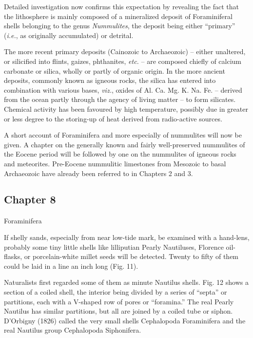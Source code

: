 \documentclass[a4paper, 12pt, oneside]{article}
\begin{document}
Detailed investigation now confirms this expectation by revealing the fact that the lithosphere is mainly composed of a mineralized deposit of Foraminiferal shells belonging to the genus \emph{Nummulites}, the deposit being either ``primary'' (\emph{i.e.}, as originally accumulated) or detrital.

The more recent primary deposits (Cainozoic to Archaeozoic) -- either unaltered, or silicified into flints, gaizes, phthanites, \emph{etc.} -- are composed chiefly of calcium carbonate or silica, wholly or partly of organic origin. In the more ancient deposits, commonly known as igneous rocks, the silica has entered into combination with various bases, \emph{viz.}, oxides of Al. Ca. Mg. K. Na. Fe. -- derived from the ocean partly through the agency of living matter -- to form silicates. Chemical activity has been favoured by high temperature, possibly due in greater or less degree to the storing-up of heat derived from radio-active sources.

A short account of Foraminifera and more especially of nummulites will now be given. A chapter on the generally known and fairly well-preserved nummulites of the Eocene period will be followed by one on the nummulites of igneous rocks and meteorites. Pre-Eocene nummulitic limestones from Mesozoic to basal Archaeozoic have already been referred to in Chapters 2 and 3.
\clearpage
\subsection{Chapter 8}
\paragraph{}
Foraminifera

If shelly sands, especially from near low-tide mark, be examined with a hand-lens, probably some tiny little shells like lilliputian Pearly Nautiluses, Florence oil-flasks, or porcelain-white millet seeds will be detected. Twenty to fifty of them could be laid in a line an inch long (Fig. 11).

Naturalists first regarded some of them as minute Nautilus shells. Fig. 12 shows a section of a coiled shell, the interior being divided by a series of ``septa'' or partitions, each with a V-shaped row of pores or ``foramina.'' The real Pearly Nautilus has similar partitions, but all are joined by a coiled tube or siphon. D'Orbigny (1826) called the very small shells Cephalopoda Foraminifera and the real Nautilus group Cephalopoda Siphonifera.
\end{document}
